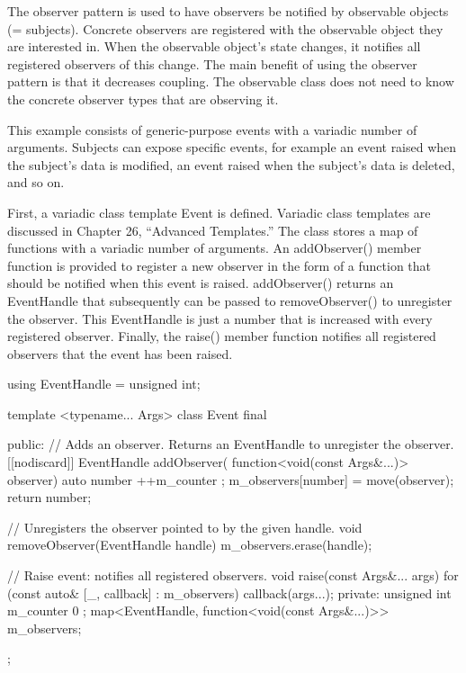 
The observer pattern is used to have observers be notified by observable objects (= subjects). Concrete observers are registered with the observable object they are interested in. When the observable object’s state changes, it notifies all registered observers of this change. The main benefit of using the observer pattern is that it decreases coupling. The observable class does not need to know the concrete observer types that are observing it.


This example consists of generic-purpose events with a variadic number of arguments. Subjects can expose specific events, for example an event raised when the subject’s data is modified, an event raised when the subject’s data is deleted, and so on.


First, a variadic class template Event is defined. Variadic class templates are discussed in Chapter 26, “Advanced Templates.” The class stores a map of functions with a variadic number of arguments. An addObserver() member function is provided to register a new observer in the form of a function that should be notified when this event is raised. addObserver() returns an EventHandle that subsequently can be passed to removeObserver() to unregister the observer. This EventHandle is just a number that is increased with every registered observer. Finally, the raise() member function notifies all registered observers that the event has been raised.

\begin{cpp}
using EventHandle = unsigned int;

template <typename... Args>
class Event final
{
    public:
        // Adds an observer. Returns an EventHandle to unregister the observer.
        [[nodiscard]] EventHandle addObserver(
        function<void(const Args&...)> observer)
        {
            auto number { ++m_counter };
            m_observers[number] = move(observer);
            return number;
        }

        // Unregisters the observer pointed to by the given handle.
        void removeObserver(EventHandle handle)
        {
            m_observers.erase(handle);
        }

        // Raise event: notifies all registered observers.
        void raise(const Args&... args)
        {
            for (const auto& [_, callback] : m_observers) { callback(args...); }
        }
    private:
        unsigned int m_counter { 0 };
        map<EventHandle, function<void(const Args&...)>> m_observers;
};
\end{cpp}

